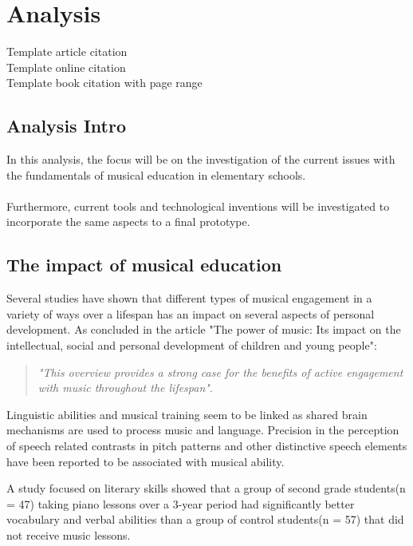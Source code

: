 \chapter{Analysis}
Template article citation\cite{articleTemplate}\\
Template online citation\cite{onlineTemplate}\\
Template book citation with page range\cite[p.~442-444]{interactionDesign}

\section{Analysis Intro}
In this analysis, the focus will be on the investigation of the current issues with the fundamentals of musical education in elementary schools.\\
\\
Furthermore, current tools and technological inventions will be investigated to incorporate the same aspects to a final prototype.

\section{The impact of musical education}
Several studies have shown that different types of musical engagement in a variety of ways over a lifespan has an impact on several aspects of personal development. As concluded in the article "The power of music: Its impact on the intellectual, social and personal development of children and young people":\\

\begin{quote}
	\textit{"This overview provides a strong case for the benefits of active engagement with music throughout the lifespan"}\cite{powerOfMusic}\label{quote:powerOfMusic}.\\
\end{quote}

Linguistic abilities and musical training seem to be linked as shared brain mechanisms are used to process music and language. Precision in the perception of speech related contrasts in pitch patterns and other distinctive speech elements have been reported to be associated with musical ability\cite{languageSkills}.

A study focused on literary skills showed that a group of second grade students(n = 47) taking piano lessons over a 3-year period had significantly better vocabulary and verbal abilities than a group of control students(n = 57) that did not receive music lessons\cite{vocabularySkills}.

